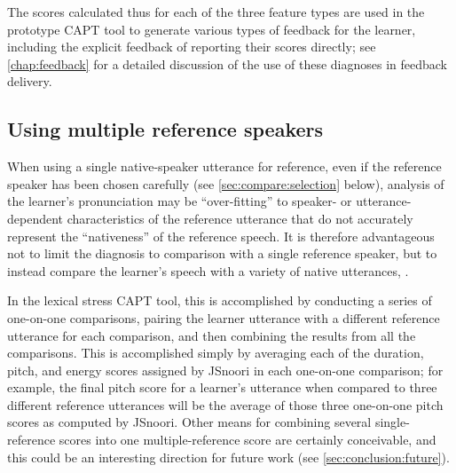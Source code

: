 	



	\vspace{2em}
	
	The scores calculated thus for each of the three feature types are used in the prototype CAPT tool to generate various types of feedback for the learner, including the explicit feedback of reporting their scores directly; see \cref{chap:feedback} for a detailed discussion of the use of these diagnoses in feedback delivery.


	\subsection{Using multiple reference speakers}
	\label{sec:compare:multi}
	
	When using a single native-speaker utterance for reference, even if the reference speaker has been chosen carefully (see \cref{sec:compare:selection} below), analysis of the learner's pronunciation may be ``over-fitting'' to speaker- or utterance-dependent characteristics of the reference utterance that do not accurately represent the ``nativeness'' of the reference speech. It is therefore advantageous not to limit the diagnosis to comparison with a single reference speaker, but to instead compare the learner's speech with a variety of native utterances, .
	
	In the lexical stress CAPT tool, this is accomplished by conducting a series of one-on-one comparisons, pairing the learner utterance with a different reference utterance for each comparison, and then combining the results from all the comparisons. This is accomplished simply by averaging each of the duration, pitch, and energy scores assigned by JSnoori in each one-on-one comparison; for example, the final pitch score for a learner's utterance when compared to three different reference utterances will be the average of those three one-on-one pitch scores as computed by JSnoori. Other means for combining several single-reference scores into one multiple-reference score are certainly conceivable, and this could be an interesting direction for future work (see \cref{sec:conclusion:future}).
	
